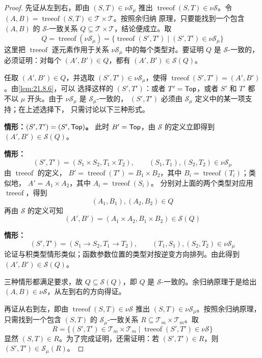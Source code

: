 \begin{proof}
先证从左到右，即由 \((S,T)\in\nu\mathcal S_\mu\) 推出
\(\operatorname{treeof}(S,T)\in\nu\mathcal S\)。令
\((A,B)=\operatorname{treeof}(S,T)\in\mathcal T\times\mathcal T\)。按照余归纳
原理，只要能找到一个包含 \((A,B)\) 的 \(\mathcal S\)-一致关系
\(Q\subseteq\mathcal T\times\mathcal T\)，结论便成立。取
\[
Q=\operatorname{treeof}(\nu\mathcal S_\mu)
=\{\operatorname{treeof}(S',T')\mid(S',T')\in\nu\mathcal S_\mu\}
\]
这里把 \(\operatorname{treeof}\) 逐元素作用于关系
\(\nu\mathcal S_\mu\) 中的每个类型对。要证明 \(Q\) 是
\(\mathcal S\)-一致的，必须证明：对每个 \((A',B')\in Q\)，都有
\((A',B')\in\mathcal S(Q)\)。

任取 \((A',B')\in Q\)，并选取
\((S',T')\in\nu\mathcal S_\mu\)，使得
\(\operatorname{treeof}(S',T')=(A',B')\)。由\cref{lem:21.8.6}，可以
选择这样的 \((S',T')\)：或者 \(T'=\mathsf{Top}\)，或者 \(S'\) 和
\(T'\) 都不以 \(\mu\) 开头。由于
\(\nu\mathcal S_\mu\) 是 \(\mathcal S_\mu\)-一致的，
\((S',T')\) 必须由 \(\mathcal S_\mu\) 定义中的某一项支持；在上述选择下，
只需讨论以下三种形式。

\textbf{情形：\((S',T')=(S',\mathsf{Top})\)。}
此时 \(B'=\mathsf{Top}\)，由 \(\mathcal S\) 的定义立即得到
\((A',B')\in\mathcal S(Q)\)。

\textbf{情形：}
\[
(S',T')=(S_1\times S_2,T_1\times T_2),
\qquad
(S_1,T_1),(S_2,T_2)\in\nu\mathcal S_\mu
\]
由 \(\operatorname{treeof}\) 的定义，
\(B'=\operatorname{treeof}(T')=B_1\times B_2\)，其中
\(B_i=\operatorname{treeof}(T_i)\)；类似地，
\(A'=A_1\times A_2\)，其中 \(A_i=\operatorname{treeof}(S_i)\)。
分别对上面的两个类型对应用 \(\operatorname{treeof}\)，得到
\[
(A_1,B_1),(A_2,B_2)\in Q
\]
再由 \(\mathcal S\) 的定义可知
\[
(A',B')=(A_1\times A_2,B_1\times B_2)\in\mathcal S(Q)
\]

\textbf{情形：}
\[
(S',T')=(S_1\to S_2,T_1\to T_2),
\qquad
(T_1,S_1),(S_2,T_2)\in\nu\mathcal S_\mu
\]
论证与积类型情形类似；函数参数位置的类型对按逆变方向排列。由此得到
\((A',B')\in\mathcal S(Q)\)。

三种情形都满足要求，故 \(Q\subseteq\mathcal S(Q)\)，即 \(Q\) 是
\(\mathcal S\)-一致的。余归纳原理于是给出
\((A,B)\in\nu\mathcal S\)，从左到右的方向得证。

再证从右到左，即由 \(\operatorname{treeof}(S,T)\in\nu\mathcal S\) 推出
\((S,T)\in\nu\mathcal S_\mu\)。按照余归纳原理，只需找到一个包含
\((S,T)\) 的 \(\mathcal S_\mu\)-一致关系
\(R\subseteq\mathcal T_m\times\mathcal T_m\)。取
\[
R=\{(S',T')\in\mathcal T_m\times\mathcal T_m
\mid\operatorname{treeof}(S',T')\in\nu\mathcal S\}
\]
显然 \((S,T)\in R\)。为了完成证明，还需证明：若
\((S',T')\in R\)，则 \((S',T')\in\mathcal S_\mu(R)\)。


\end{proof}
